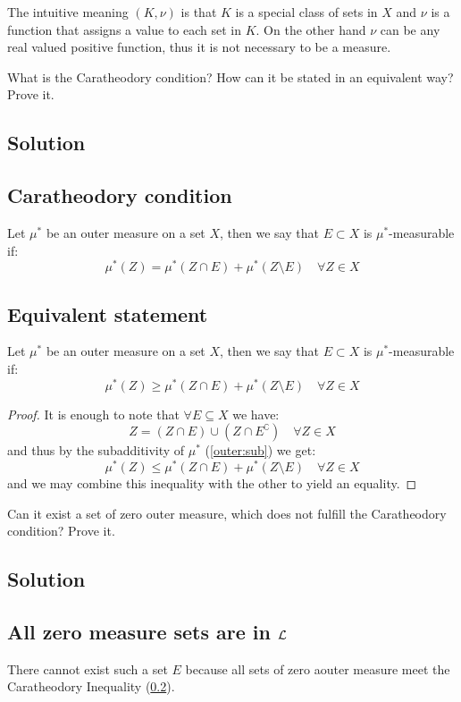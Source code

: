 The intuitive meaning $(K,\nu)$ is that $K$ is a special class of sets in $X$ and $\nu$ is a function that assigns a value to each set in $K$. On the other hand $\nu$ can be any real valued positive function, thus it is not necessary to be a measure. 


\question
What is the Caratheodory condition? How can it be stated in an equivalent way? Prove it.

\subsection*{Solution}

\subsection{Caratheodory condition} \label{CarEq}
Let $\mu^*$ be an outer measure on a set $X$, then we say that $E\subset X$ is $\mu^*$-measurable if:
\[
    \mu^*(Z) = \mu^*(Z\cap E) + \mu^*(Z\setminus E) \quad \forall Z\in X
\]

\subsection{Equivalent statement}\label{CarIneq}
Let $\mu^*$ be an outer measure on a set $X$, then we say that $E\subset X$ is $\mu^*$-measurable if:
\[
    \mu^*(Z) \geq \mu^*(Z\cap E) + \mu^*(Z\setminus E) \quad \forall Z\in X
\]
\begin{proof}
    It is enough to note that $\forall E\subseteq X$ we have:
    \[
        Z = (Z\cap E) \cup (Z \cap E^\complement) \quad \forall Z\in X
    \]
    and thus by the subadditivity of $\mu^*$ (\ref{outer:sub}) we get:
    \[
        \mu^*(Z) \leq \mu^*(Z\cap E) + \mu^*(Z\setminus E) \quad \forall Z\in X    
    \]
    and we may combine this inequality with the other to yield an equality.
\end{proof}


\question
Can it exist a set of zero outer measure, which does not fulfill the Caratheodory condition? Prove it.

\subsection*{Solution}

\subsection{All zero measure sets are in \texorpdfstring{$\mathcal{L}$}{L}} \label{zerosetsaremeas}
There cannot exist such a set $E$ because all sets of zero aouter measure meet the Caratheodory Inequality (\ref{CarIneq}).

